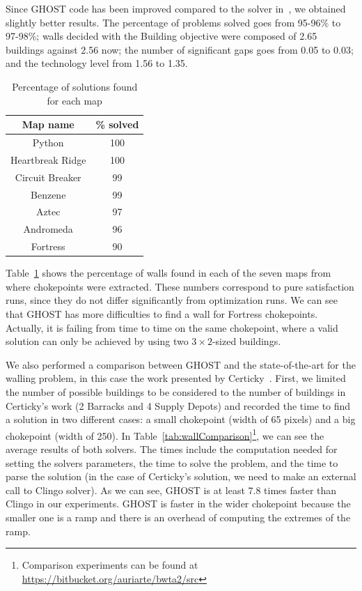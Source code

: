 \documentclass[journal]{IEEEtran}
\newcommand{\ghost}{\textsc{GHOST}\xspace}
\begin{document}
Since  \ghost   code  has  been   improved  compared  to   the  solver
in~\cite{RichouxUO14},  we  obtained   slightly  better  results.  The
percentage  of problems  solved goes  from 95-96\%  to 97-98\%;  walls
decided with  the Building objective  were composed of  2.65 buildings
against 2.56  now; the number  of significant  gaps goes from  0.05 to
0.03; and the technology level from 1.56 to 1.35.
\begin{table}[ht]
  \caption{Percentage of solutions found for each map}
    \label{tab:map}
    \centering
    \begin{tabular}{|c|c|}
      \hline
      Map name & \% solved\\
      \hline
      Python & 100\\
      Heartbreak Ridge & 100\\
      Circuit Breaker & 99\\
      Benzene & 99\\
      Aztec & 97\\
      Andromeda & 96\\
      Fortress & 90\\
      \hline
    \end{tabular}
\end{table}
Table~\ref{tab:map} shows the percentage of walls found in each of the
seven  maps  from where  chokepoints  were  extracted.  These  numbers
correspond  to  pure  satisfaction  runs,  since  they  do  not  differ
significantly from optimization  runs. We can see that  \ghost has more
difficulties to find a wall  for Fortress chokepoints. Actually, it is
failing  from time  to  time on  the same  chokepoint,  where a  valid
solution  can  only  be  achieved  by using  two  $3  \times  2$-sized
buildings.


We also performed a comparison between \ghost and the state-of-the-art for the walling problem, in this case the work presented by Certicky~\cite{Certicky13}. First, we limited the number of possible buildings to be considered to the number of buildings in Certicky's work (2 Barracks and 4 Supply Depots) and recorded the time to find a solution in two different cases: a small chokepoint (width of 65 pixels) and a big chokepoint (width of 250). In Table~\ref{tab:wallComparison}\footnote{Comparison experiments can be found at \url{https://bitbucket.org/auriarte/bwta2/src}}, we can see the average results of both solvers. The times include the computation needed for setting the solvers parameters, the time to solve the problem, and the time to parse the solution (in the case of Certicky's solution, we need to make an external call to Clingo solver). As we can see, \ghost is at least 7.8 times faster than Clingo in our experiments. \ghost is faster in the wider chokepoint because the smaller one is a ramp and there is an overhead of computing the extremes of the ramp.
\end{document}
